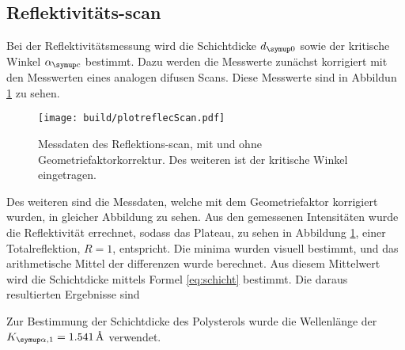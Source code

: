 \subsection{Reflektivitäts-scan}
Bei der Reflektivitätsmessung wird die Schichtdicke $d\idx{0}$ sowie der kritische Winkel $\alpha\idx{c}$ bestimmt. Dazu werden die Messwerte
zunächst korrigiert mit den Messwerten eines analogen difusen Scans. Diese Messwerte sind in Abbildun \ref{fig:refl} zu sehen. 
\begin{figure}
    \centering
    \texttt{[image: build/plotreflecScan.pdf]}
    \caption{Messdaten des Reflektions-scan, mit und ohne Geometriefaktorkorrektur. Des weiteren ist der kritische Winkel eingetragen.}
    \label{fig:refl}
\end{figure}
Des weiteren sind die Messdaten, welche mit dem Geometriefaktor korrigiert wurden, in gleicher Abbildung zu sehen. Aus den gemessenen 
Intensitäten wurde die Reflektivität errechnet, sodass das Plateau, zu sehen in Abbildung \ref{fig:refl}, einer Totalreflektion, $R=1$, 
entspricht. Die minima wurden visuell bestimmt, und das arithmetische Mittel der differenzen wurde berechnet. Aus diesem Mittelwert wird die 
Schichtdicke mittels Formel \eqref{eq:schicht} bestimmt. Die daraus resultierten Ergebnisse sind 

Zur Bestimmung der Schichtdicke des Polysterols wurde die Wellenlänge der $K\idx{\alpha, 1} = 1.541\,\si{\angstrom}$ verwendet.
